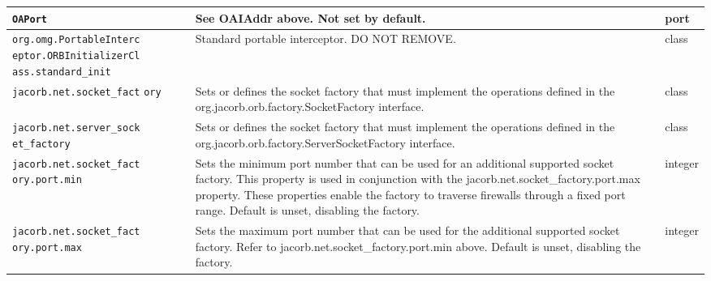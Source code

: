 \begin{small}
\begin{longtable}{|p{5cm}|p{9cm}|p{2cm}|}
\hline
\verb"OAPort" & See OAIAddr above. Not set by default. & port \\
\hline
\verb"org.omg.PortableInterc"
\verb"eptor.ORBInitializerCl"
\verb"ass.standard_init" & Standard portable interceptor. DO NOT REMOVE. & class \\
\hline
\verb"jacorb.net.socket_fact"
\verb"ory" & Sets or defines the socket factory that must implement the operations defined in the org.jacorb.orb.factory.SocketFactory interface. & class \\
\hline
\verb"jacorb.net.server_sock"
\verb"et_factory" & Sets or defines the socket factory that must implement the operations defined in the org.jacorb.orb.factory.ServerSocketFactory interface. & class \\
\hline
\verb"jacorb.net.socket_fact"
\verb"ory.port.min" & Sets the minimum port number that can be used for an additional supported socket factory. This property is used in conjunction with the jacorb.net.socket\_factory.port.max property. These properties enable the factory to traverse firewalls through a fixed port range. Default is unset, disabling the factory. & integer \\
\hline
\verb"jacorb.net.socket_fact"
\verb"ory.port.max" & Sets the maximum port number that can be used for the additional supported socket factory. Refer to jacorb.net.socket\_factory.port.min above. Default is unset, disabling the factory. & integer \\
\hline

\end{longtable}
\end{small}


